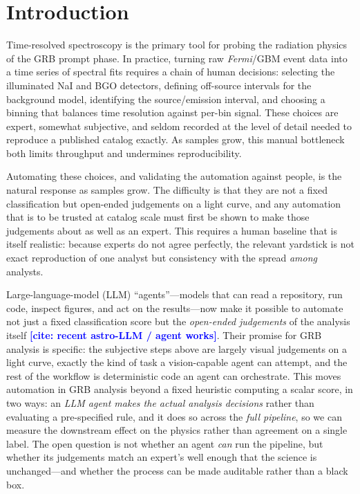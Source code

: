 \documentclass[twocolumn]{aastex631}
\newcommand{\TODOcite}[1]{\textbf{\textcolor{blue}{[cite: #1]}}}
\begin{document}

\section{Introduction} \label{sec:intro}
Time-resolved spectroscopy is the primary tool for probing the radiation physics
of the GRB prompt phase. In practice, turning raw \textit{Fermi}/GBM event data
into a time series of spectral fits requires a chain of human decisions: selecting
the illuminated NaI and BGO detectors, defining off-source intervals for the
background model, identifying the source/emission interval, and choosing a binning
that balances time resolution against per-bin signal. These choices are expert,
somewhat subjective, and seldom recorded at the level of detail needed to reproduce
a published catalog exactly. As samples grow, this manual bottleneck both limits
throughput and undermines reproducibility.

Automating these choices, and validating the automation against people, is the natural
response as samples grow. The difficulty is that they are not a fixed classification
but open-ended judgements on a light curve, and any automation that is to be trusted at
catalog scale must first be shown to make those judgements about as well as an expert.
This requires a human baseline that is itself realistic: because experts do not agree
perfectly, the relevant yardstick is not exact reproduction of one analyst but
consistency with the spread \emph{among} analysts.

Large-language-model (LLM) ``agents''---models that can read a repository, run code,
inspect figures, and act on the results---now make it possible to automate not just a
fixed classification score but the \emph{open-ended judgements} of the analysis itself
\TODOcite{recent astro-LLM / agent works}. Their promise for GRB analysis is specific:
the subjective steps above are largely visual judgements on a light curve, exactly the
kind of task a vision-capable agent can attempt, and the rest of the workflow is
deterministic code an agent can orchestrate. This moves automation in GRB analysis
beyond a fixed heuristic computing a scalar score, in two ways: an \emph{LLM agent
makes the actual analysis decisions} rather than evaluating a pre-specified rule, and
it does so across the \emph{full pipeline}, so we can measure the downstream effect on
the physics rather than agreement on a single label. The open question is not whether
an agent \emph{can} run the
pipeline, but whether its judgements match an expert's well enough that the science is
unchanged---and whether the process can be made auditable rather than a black box.
\end{document}
